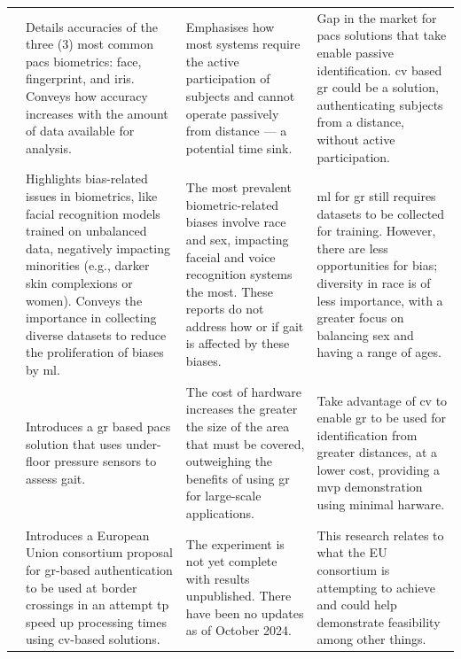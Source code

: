 \begin{xltabular}{\textwidth}{|Y|Y|Y|Y|}
    \hline

     & Details accuracies of the three (3) most common \ac{pacs} biometrics: face, fingerprint, and iris. Conveys how accuracy increases with the amount of data available for analysis. & Emphasises how most systems require the active participation of subjects and cannot operate passively from distance --- a potential time sink. & Gap in the market for \ac{pacs} solutions that take enable passive identification. \ac{cv} based \ac{gr} could be a solution, authenticating subjects from a distance, without active participation. \\

     & Highlights bias-related issues in biometrics, like facial recognition models trained on unbalanced data, negatively impacting minorities (e.g., darker skin complexions or women).  Conveys the importance in collecting diverse datasets to reduce the proliferation of biases by \ac{ml}. & The most prevalent biometric-related biases involve race and sex, impacting faceial and voice recognition systems the most. These reports do not address how or if gait is affected by these biases. & \ac{ml} for \ac{gr} still requires datasets to be collected for training. However, there are less opportunities for bias; diversity in race is of less importance, with a greater focus on balancing sex and having a range of ages. \\

    \hline

     & Introduces a \ac{gr} based \ac{pacs} solution that uses under-floor pressure sensors to assess gait. & The cost of hardware increases the greater the size of the area that must be covered, outweighing the benefits of using \ac{gr} for large-scale applications. & Take advantage of \ac{cv} to enable \ac{gr} to be used for identification from greater distances, at a lower cost, providing a \ac{mvp} demonstration using minimal harware. \\

    \hline

     & Introduces a European Union consortium proposal for \ac{gr}-based authentication to be used at border crossings in an attempt tp speed up processing times using \ac{cv}-based solutions. & The experiment is not yet complete with results unpublished. There have been no updates as of October 2024. & This research relates to what the EU consortium is attempting to achieve and could help demonstrate feasibility among other things.
\end{xltabular}
\normalsize

